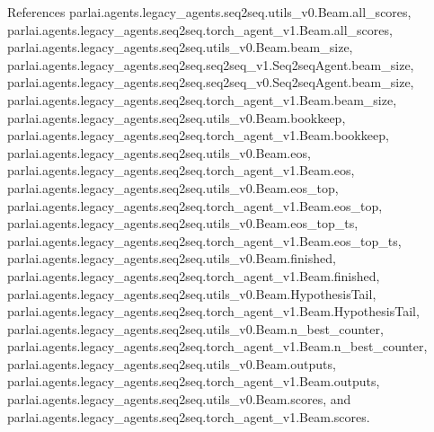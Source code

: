 References parlai.\+agents.\+legacy\+\_\+agents.\+seq2seq.\+utils\+\_\+v0.\+Beam.\+all\+\_\+scores, parlai.\+agents.\+legacy\+\_\+agents.\+seq2seq.\+torch\+\_\+agent\+\_\+v1.\+Beam.\+all\+\_\+scores, parlai.\+agents.\+legacy\+\_\+agents.\+seq2seq.\+utils\+\_\+v0.\+Beam.\+beam\+\_\+size, parlai.\+agents.\+legacy\+\_\+agents.\+seq2seq.\+seq2seq\+\_\+v1.\+Seq2seq\+Agent.\+beam\+\_\+size, parlai.\+agents.\+legacy\+\_\+agents.\+seq2seq.\+seq2seq\+\_\+v0.\+Seq2seq\+Agent.\+beam\+\_\+size, parlai.\+agents.\+legacy\+\_\+agents.\+seq2seq.\+torch\+\_\+agent\+\_\+v1.\+Beam.\+beam\+\_\+size, parlai.\+agents.\+legacy\+\_\+agents.\+seq2seq.\+utils\+\_\+v0.\+Beam.\+bookkeep, parlai.\+agents.\+legacy\+\_\+agents.\+seq2seq.\+torch\+\_\+agent\+\_\+v1.\+Beam.\+bookkeep, parlai.\+agents.\+legacy\+\_\+agents.\+seq2seq.\+utils\+\_\+v0.\+Beam.\+eos, parlai.\+agents.\+legacy\+\_\+agents.\+seq2seq.\+torch\+\_\+agent\+\_\+v1.\+Beam.\+eos, parlai.\+agents.\+legacy\+\_\+agents.\+seq2seq.\+utils\+\_\+v0.\+Beam.\+eos\+\_\+top, parlai.\+agents.\+legacy\+\_\+agents.\+seq2seq.\+torch\+\_\+agent\+\_\+v1.\+Beam.\+eos\+\_\+top, parlai.\+agents.\+legacy\+\_\+agents.\+seq2seq.\+utils\+\_\+v0.\+Beam.\+eos\+\_\+top\+\_\+ts, parlai.\+agents.\+legacy\+\_\+agents.\+seq2seq.\+torch\+\_\+agent\+\_\+v1.\+Beam.\+eos\+\_\+top\+\_\+ts, parlai.\+agents.\+legacy\+\_\+agents.\+seq2seq.\+utils\+\_\+v0.\+Beam.\+finished, parlai.\+agents.\+legacy\+\_\+agents.\+seq2seq.\+torch\+\_\+agent\+\_\+v1.\+Beam.\+finished, parlai.\+agents.\+legacy\+\_\+agents.\+seq2seq.\+utils\+\_\+v0.\+Beam.\+Hypothesis\+Tail, parlai.\+agents.\+legacy\+\_\+agents.\+seq2seq.\+torch\+\_\+agent\+\_\+v1.\+Beam.\+Hypothesis\+Tail, parlai.\+agents.\+legacy\+\_\+agents.\+seq2seq.\+utils\+\_\+v0.\+Beam.\+n\+\_\+best\+\_\+counter, parlai.\+agents.\+legacy\+\_\+agents.\+seq2seq.\+torch\+\_\+agent\+\_\+v1.\+Beam.\+n\+\_\+best\+\_\+counter, parlai.\+agents.\+legacy\+\_\+agents.\+seq2seq.\+utils\+\_\+v0.\+Beam.\+outputs, parlai.\+agents.\+legacy\+\_\+agents.\+seq2seq.\+torch\+\_\+agent\+\_\+v1.\+Beam.\+outputs, parlai.\+agents.\+legacy\+\_\+agents.\+seq2seq.\+utils\+\_\+v0.\+Beam.\+scores, and parlai.\+agents.\+legacy\+\_\+agents.\+seq2seq.\+torch\+\_\+agent\+\_\+v1.\+Beam.\+scores.

\mbox{\label{classparlai_1_1agents_1_1legacy__agents_1_1seq2seq_1_1utils__v0_1_1Beam_abea53933203e2126e38657efe715b8b5}} 
